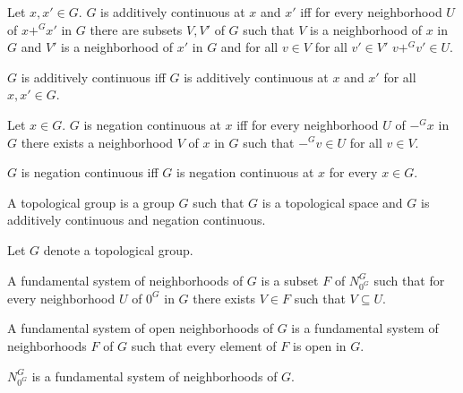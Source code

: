 \documentclass[english,11pt]{article}
\newcommand{\neigh}[2]{N^{#2}_{#1}}
\begin{document}
\begin{forthel}

\begin{definition}
Let $x,x' \in G$. $G$ is additively continuous at $x$ and $x'$ iff
for every neighborhood $U$ of $x +^{G} x'$ in $G$
there are subsets $V,V'$ of $G$ such that 
$V$ is a neighborhood of $x$ in $G$ and $V'$ is a neighborhood
of $x'$ in $G$ and for all $v \in V$ for all $v' \in V'$ 
$v +^{G} v' \in U$.
\end{definition}

\begin{definition}
$G$ is additively continuous iff $G$ is additively continuous at
$x$ and $x'$ for all $x,x' \in G$.
\end{definition}

\begin{definition}
Let $x \in G$. $G$ is negation continuous at $x$ iff
for every neighborhood $U$ of $-^{G} x$ in $G$
there exists a neighborhood $V$ of $x$ in $G$ such that 
$-^{G} v \in U$ for all $v \in V$.
\end{definition}

\begin{definition}
$G$ is negation continuous iff $G$ is negation continuous at $x$
for every $x \in G$.
\end{definition}

\begin{definition}[title = Topological group]
A topological group is a group $G$ such that $G$ is a topological space
and $G$ is additively continuous and negation continuous.
\end{definition}

Let $G$ denote a topological group.

\begin{definition}
A fundamental system of neighborhoods of $G$ is a subset $F$ of $\neigh{0^{G}}{G}$ such
that for every neighborhood $U$ of $0^{G}$ in $G$ there exists $V \in F$ such that
$V \subseteq U$.
\end{definition}

\begin{definition}
A fundamental system of open neighborhoods of $G$ is 
a fundamental system of neighborhoods $F$ of $G$ such
that every element of $F$ is open in $G$.
\end{definition}


\begin{proposition}
$\neigh{0^{G}}{G}$ is a fundamental system of neighborhoods of $G$.
\end{proposition}


\end{forthel}
\end{document}
